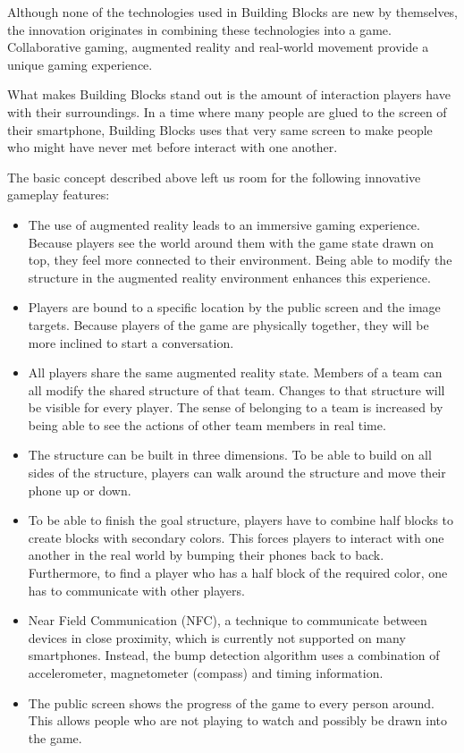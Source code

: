 \documentclass{chi-ext}
\begin{document}
Although none of the technologies used in Building Blocks are new by themselves, the innovation originates in combining these technologies into a game. Collaborative gaming, augmented reality and real-world movement provide a unique gaming experience.

What makes Building Blocks stand out is the amount of interaction players have with their surroundings. In a time where many people are glued to the screen of their smartphone, Building Blocks uses that very same screen to make people who might have never met before interact with one another.

The basic concept described above left us room for the following innovative gameplay features:

\begin{itemize}
\item The use of augmented reality leads to an immersive gaming experience. Because players see the world around them with the game state drawn on top, they feel more connected to their environment. Being able to modify the structure in the augmented reality environment enhances this experience.

\item Players are bound to a specific location by the public screen and the image targets. Because players of the game are physically together, they will be more inclined to start a conversation.

\item All players share the same augmented reality state. Members of a team can all modify the shared structure of that team. Changes to that structure will be visible for every player. The sense of belonging to a team is increased by being able to see the actions of other team members in real time.

\item The structure can be built in three dimensions. To be able to build on all sides of the structure, players can walk around the structure and move their phone up or down.

\item To be able to finish the goal structure, players have to combine half blocks to create blocks with secondary colors. This forces players to interact with one another in the real world by bumping their phones back to back. Furthermore, to find a player who has a half block of the required color, one has to communicate with other players.

\item Near Field Communication (NFC), a technique to communicate between devices in close proximity, which is currently not supported on many smartphones. Instead, the bump detection algorithm uses a combination of accelerometer, magnetometer (compass) and timing information.

\item The public screen shows the progress of the game to every person around. This allows people who are not playing to watch and possibly be drawn into the game.
\end{itemize}
\end{document}
